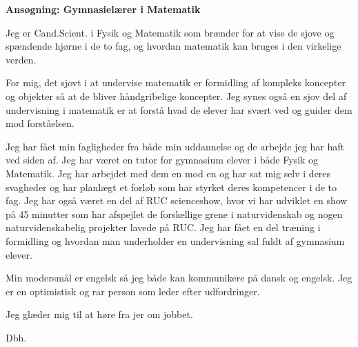 \documentclass[10pt,a4paper]{letter}
\begin{document}
\begin{letter}{}
\opening{\textbf{Ansøgning: Gymnasielærer i Matematik}}

Jeg er Cand.Scient. i Fysik og Matematik som brænder for at vise de sjove og spændende hjørne i de to fag, og hvordan matematik kan bruges i den virkelige verden. 

For mig, det sjovt i at undervise matematik er formidling af kompleks koncepter og objekter så at de bliver håndgribelige koncepter. Jeg synes også en sjov del af undervisning i matematik er at forstå hvad de elever har svært ved og guider dem mod forståelsen.

Jeg har fået min fagligheder fra både min uddannelse og de arbejde jeg har haft ved siden af. Jeg har været en tutor for gymnasium elever i både Fysik og Matematik. Jeg har arbejdet med dem en mod en og har sat mig selv i deres svagheder og har planlægt et forløb som har styrket deres kompetencer i de to fag. Jeg har også været en del af RUC scienceshow, hvor vi har udviklet en show på 45 minutter som har afspejlet de forskellige grene i naturvidenskab og nogen naturvidenskabelig projekter lavede på RUC. Jeg har fået en del træning i formidling og hvordan man underholder en undervisning sal fuldt af gymnasium elever. 

Min modersmål er engelsk så jeg både kan kommunikere på dansk og engelsk. Jeg er en optimistisk og rar person som leder efter udfordringer.  

Jeg glæder mig til at høre fra jer om jobbet.  

\closing{Dbh.}

\end{letter}

\end{document}
